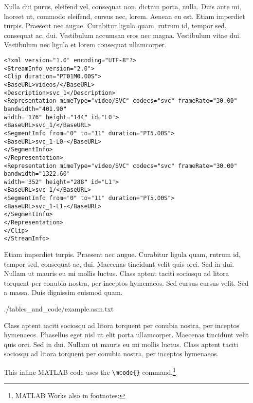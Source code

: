 Nulla dui purus, eleifend vel, consequat non, dictum porta, nulla. Duis ante mi, laoreet ut, commodo eleifend, cursus nec, lorem. Aenean eu est. Etiam imperdiet turpis. Praesent nec augue. Curabitur ligula quam, rutrum id, tempor sed, consequat ac, dui. Vestibulum accumsan eros nec magna. Vestibulum vitae dui. Vestibulum nec ligula et lorem consequat ullamcorper. 

\begin{lstlisting}[frame=lines,style=XML,caption={Example of a XML file.},label=xmlEx]
<?xml version="1.0" encoding="UTF-8"?>
<StreamInfo version="2.0">
<Clip duration="PT01M0.00S">
<BaseURL>videos/</BaseURL>
<Description>svc_1</Description>
<Representation mimeType="video/SVC" codecs="svc" frameRate="30.00" bandwidth="401.90"
width="176" height="144" id="L0">
<BaseURL>svc_1/</BaseURL>
<SegmentInfo from="0" to="11" duration="PT5.00S">
<BaseURL>svc_1-L0-</BaseURL>
</SegmentInfo>
</Representation>
<Representation mimeType="video/SVC" codecs="svc" frameRate="30.00" bandwidth="1322.60"
width="352" height="288" id="L1">
<BaseURL>svc_1/</BaseURL>
<SegmentInfo from="0" to="11" duration="PT5.00S">
<BaseURL>svc_1-L1-</BaseURL>
</SegmentInfo>
</Representation>
</Clip>
</StreamInfo>
\end{lstlisting}

Etiam imperdiet turpis. Praesent nec augue. Curabitur ligula quam, rutrum id, tempor sed, consequat ac, dui. Maecenas tincidunt velit quis orci. Sed in dui. Nullam ut mauris eu mi mollis luctus. Class aptent taciti sociosqu ad litora torquent per conubia nostra, per inceptos hymenaeos. Sed cursus cursus velit. Sed a massa. Duis dignissim euismod quam.

\begin{spacing}{0.5}
	
	{./tables_and_code/example.asm.txt}
\end{spacing}


Class aptent taciti sociosqu ad litora torquent per conubia nostra, per inceptos hymenaeos. Phasellus eget nisl ut elit porta ullamcorper. Maecenas tincidunt velit quis orci. Sed in dui. Nullam ut mauris eu mi mollis luctus. Class aptent taciti sociosqu ad litora torquent per conubia nostra, per inceptos hymenaeos.

This inline MATLAB code  uses the \verb|\mcode{}| command.\footnote{MATLAB Works also in footnotes: }

